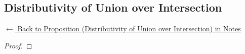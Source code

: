 
\subsection*{Distributivity of Union over Intersection}
\label{prf:dist-cup-over-cap}

\begin{remark*}[Return]
\hyperref[prop:dist-cup-over-cap]{$\leftarrow$ Back to Proposition (Distributivity of Union over Intersection) in Notes}
\end{remark*}

\begin{proof}
\end{proof}

\begin{remark*}

\end{remark*}

\begin{remark*}[Dependencies]

\FlashUses{}
\end{remark*}
